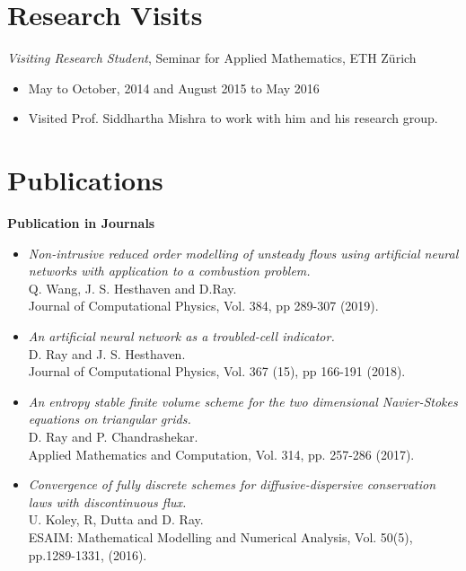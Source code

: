 \documentclass[margin]{res}
\begin{document}
\begin{resume}
\section{Research Visits}
 {\it Visiting Research Student}, Seminar for Applied Mathematics, ETH Z\"{u}rich
 \begin{itemize} \itemsep -2pt  %
 \item May to October, 2014 and August 2015 to May 2016            
 \item Visited Prof. Siddhartha Mishra to work with him and his research group.
 \end{itemize}
 
 \newpage

 \section{Publications}

\textbf{Publication in Journals}                
            \begin{itemize}            
            
            \item {\it Non-intrusive reduced order modelling of unsteady flows using artificial neural networks with application to a combustion problem.} \\
              Q. Wang, J. S. Hesthaven and D.Ray.\\
              Journal of Computational Physics, Vol. 384, pp 289-307 (2019).
            
           \item {\it An artificial neural network as a troubled-cell indicator.}\\
            D. Ray and J. S. Hesthaven.\\
            Journal of Computational Physics, Vol. 367 (15), pp 166-191 (2018).

            \item {\it An entropy stable finite volume scheme for the two dimensional Navier-Stokes equations on triangular grids.}\\
            D. Ray and P. Chandrashekar.\\
             Applied Mathematics and Computation, Vol. 314, pp. 257-286 (2017).

             \item {\it Convergence of fully discrete schemes for diffusive-dispersive conservation laws with discontinuous flux.}\\
              U. Koley, R, Dutta and D. Ray. \\
              ESAIM: Mathematical Modelling and Numerical Analysis, Vol. 50(5), pp.1289-1331, (2016).
              

\end{itemize}
\end{resume}
\end{document}
